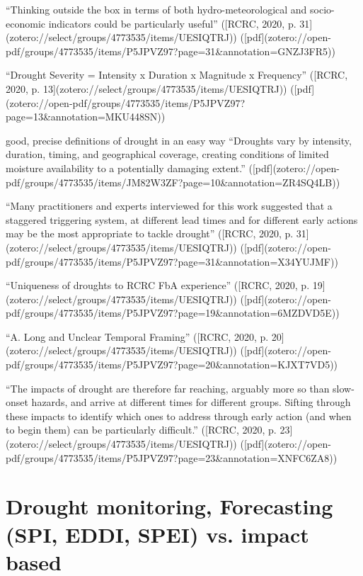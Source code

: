 {“Thinking outside the box in terms of both hydro-meteorological and socio-economic indicators could be particularly useful” ([RCRC, 2020, p. 31](zotero://select/groups/4773535/items/UESIQTRJ)) ([pdf](zotero://open-pdf/groups/4773535/items/P5JPVZ97?page=31&annotation=GNZJ3FR5))


“Drought Severity = Intensity x Duration x Magnitude x Frequency” ([RCRC, 2020, p. 13](zotero://select/groups/4773535/items/UESIQTRJ)) ([pdf](zotero://open-pdf/groups/4773535/items/P5JPVZ97?page=13&annotation=MKU448SN))


good, precise definitions of drought in an easy way
“Droughts vary by intensity, duration, timing, and geographical coverage, creating conditions of limited moisture availability to a potentially damaging extent.” ([pdf](zotero://open-pdf/groups/4773535/items/JM82W3ZF?page=10&annotation=ZR4SQ4LB))

“Many practitioners and experts interviewed for this work suggested that a staggered triggering system, at different lead times and for different early actions may be the most appropriate to tackle drought” ([RCRC, 2020, p. 31](zotero://select/groups/4773535/items/UESIQTRJ)) ([pdf](zotero://open-pdf/groups/4773535/items/P5JPVZ97?page=31&annotation=X34YUJMF))


“Uniqueness of droughts to RCRC FbA experience” ([RCRC, 2020, p. 19](zotero://select/groups/4773535/items/UESIQTRJ)) ([pdf](zotero://open-pdf/groups/4773535/items/P5JPVZ97?page=19&annotation=6MZDVD5E))

“A. Long and Unclear Temporal Framing” ([RCRC, 2020, p. 20](zotero://select/groups/4773535/items/UESIQTRJ)) ([pdf](zotero://open-pdf/groups/4773535/items/P5JPVZ97?page=20&annotation=KJXT7VD5))

“The impacts of drought are therefore far reaching, arguably more so than slow-onset hazards, and arrive at different times for different groups. Sifting through these impacts to identify which ones to address through early action (and when to begin them) can be particularly difficult.” ([RCRC, 2020, p. 23](zotero://select/groups/4773535/items/UESIQTRJ)) ([pdf](zotero://open-pdf/groups/4773535/items/P5JPVZ97?page=23&annotation=XNFC6ZA8))



\section{Drought monitoring, Forecasting (SPI, EDDI, SPEI) vs. impact based}

}
